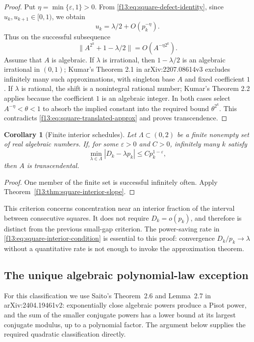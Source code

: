 \documentclass[11pt,a4paper]{article}
\newtheorem{corollary}[theorem]{Corollary}
\theoremstyle{definition}
\theoremstyle{remark}
\numberwithin{equation}{section}
\begin{document}
\begin{proof}
Put $\eta=\min\{\varepsilon,1\}>0$.  From
\eqref{f13:eq:square-defect-identity}, since $u_k,u_{k+1}\in[0,1)$, we
obtain
\[
 u_k=\lambda/2+O(p_k^{-\eta}).
\]
Thus on the successful subsequence
\begin{equation}\label{f13:eq:square-translated-approx}
 \bigl\|A^{2^k}+1-\lambda/2\bigr\|
 =O(A^{-\eta2^k}).
\end{equation}
Assume that $A$ is algebraic.  If $\lambda$ is irrational, then
$1-\lambda/2$ is an algebraic irrational in $(0,1)$; Kumar's
Theorem 2.1 in arXiv:2207.08614v3 excludes infinitely many such
approximations, with singleton base $A$ and fixed coefficient $1$.
If $\lambda$ is rational, the shift is a nonintegral rational number;
Kumar's Theorem 2.2 applies because the coefficient $1$ is an
algebraic integer.  In both cases select
$A^{-\eta}<\theta<1$ to absorb the implied constant into the
required bound $\theta^{2^k}$.  This contradicts
\eqref{f13:eq:square-translated-approx} and proves transcendence.
\end{proof}

\begin{corollary}[Finite interior schedules]
Let $\Lambda\subset(0,2)$ be a finite nonempty set of real algebraic
numbers.  If, for some $\varepsilon>0$ and $C>0$, infinitely many $k$
satisfy
\[
 \min_{\lambda\in\Lambda}|D_k-\lambda p_k|
 \le C p_k^{1-\varepsilon},
\]
then $A$ is transcendental.
\end{corollary}
\begin{proof}
One member of the finite set is successful infinitely often.  Apply
Theorem~\ref{f13:thm:square-interior-slope}.
\end{proof}

This criterion concerns concentration near an interior fraction of
the interval between consecutive squares.  It does not require
$D_k=o(p_k)$, and therefore is distinct from the previous small-gap
criterion.  The power-saving rate in
\eqref{f13:eq:square-interior-condition} is essential to this proof:
convergence $D_k/p_k\to\lambda$ without a quantitative rate is not
enough to invoke the approximation theorem.

\subsection{The unique algebraic polynomial-law exception}

For this classification we use Saito's Theorem~2.6 and Lemma~2.7
in arXiv:2404.19461v2: exponentially close algebraic powers produce
a Pisot power, and the sum of the smaller conjugate powers has a
lower bound at its largest conjugate modulus, up to a polynomial
factor. The argument below supplies the required quadratic
classification directly.
\end{document}
